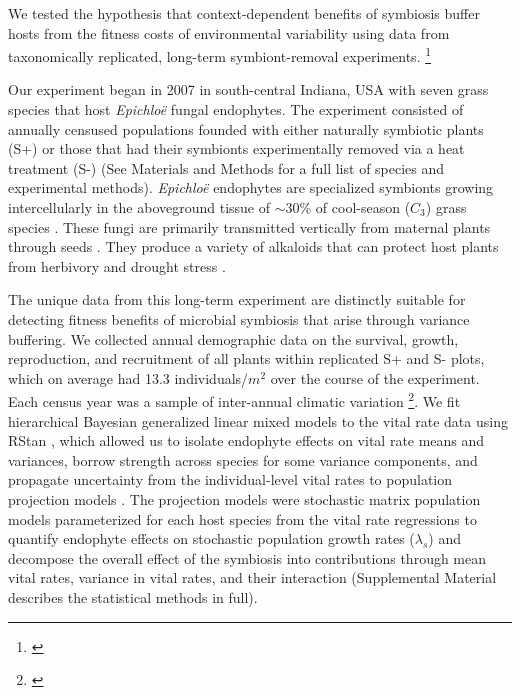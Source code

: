 \documentclass[12pt]{article}
\newcommand{\tom}[2]{{\color{red}{#1}}\footnote{\textit{\color{red}{#2}}}}
\begin{document}
We tested the hypothesis that context-dependent benefits of symbiosis buffer hosts from the fitness costs of environmental variability using data from taxonomically replicated, long-term symbiont-removal experiments. 
\tom{We  (i) quantified the effects of symbiosis on the mean and variance of host vital rates (survival, growth and reproduction), (ii) investigated the relationship between host life history traits and the magnitude of symbiont-mediated variance buffering, (iii) evaluated the relative contribution of mean and variance effects to long-term population growth rates ($\lambda_s$), and (iv) projected the consequences of symbiont-mediated variance buffering under increased environmental variability.}{I re-ordered ii and iii to be more consistent with how the text is actually laid out below. See if you agree. }

Our experiment began in 2007 in south-central Indiana, USA with seven grass species that host \emph{Epichlo\"{e}} fungal endophytes. 
The experiment consisted of annually censused populations founded with either naturally symbiotic plants (S+) or those that had their symbionts experimentally removed via a heat treatment (S-) (See Materials and Methods for a full list of species and experimental methods).
\emph{Epichlo\"{e}} endophytes are specialized symbionts growing intercellularly in the aboveground tissue of  $\sim30$\% of cool-season ($C_{3}$) grass species \cite{leuchtmann1992systematics}.
These fungi are primarily transmitted vertically from maternal plants through seeds \cite{cheplick2009ecology,rudgers2009fungus}.
They produce a variety of alkaloids that can protect host plants from herbivory \cite{brem2001epichloe} and drought stress \cite{cheplick2004recovery,kannadan2008endophyte,decunta2021systematic}.

The unique data from this long-term experiment are distinctly suitable for detecting fitness benefits of microbial symbiosis that arise through variance buffering. 
We collected annual demographic data on the survival, growth, reproduction, and recruitment of all plants within replicated S+ and S- plots, which on average had 13.3 individuals/$m^2$ over the course of the experiment. 
Each census year was a sample of inter-annual climatic variation \tom{(n = 14 years)}{Is this 14 transition years (15 censuses) or 13 transition years (14 censuses)?}.
We fit hierarchical Bayesian generalized linear mixed models to the vital rate data using RStan \cite{rstan2022}, which allowed us to isolate endophyte effects on vital rate means and variances, borrow strength across species for some variance components, and propagate uncertainty from the individual-level vital rates to population projection models \cite{elderd2016quantifying}. 
The projection models were stochastic matrix population models parameterized for each host species from the vital rate regressions to quantify endophyte effects on stochastic population growth rates ($\lambda_s$) and decompose the overall effect of the symbiosis into contributions through mean vital rates, variance in vital rates, and their interaction (Supplemental Material describes the statistical methods in full).
\end{document}
